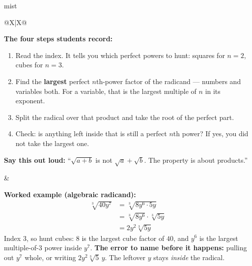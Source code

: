 \documentclass[10pt]{article}
\begin{document}
\boxguard
\begin{skillbox}{mist}
\begin{tabularx}{\linewidth}{@{}X|X@{}}
\begin{minipage}[t]{\linewidth}\vspace{0pt}
\textbf{The four steps students record:}
\begin{enumerate}[leftmargin=1.4em, itemsep=2pt, topsep=2pt]
  \item Read the index. It tells you which perfect powers to hunt: squares for $n=2$, cubes for
        $n=3$.
  \item Find the \textbf{largest} perfect $n$th-power factor of the radicand --- numbers and
        variables both. For a variable, that is the largest multiple of $n$ in its exponent.
  \item Split the radical over that product and take the root of the perfect part.
  \item Check: is anything left inside that is still a perfect $n$th power? If yes, you did not
        take the largest one.
\end{enumerate}
\textbf{Say this out loud:} ``$\sqrt{a+b}$ is not $\sqrt a + \sqrt b$. The property is about
products.''
\end{minipage}
&
\begin{minipage}[t]{\linewidth}\vspace{0pt}
\textbf{Worked example (algebraic radicand):}
\[
\begin{aligned}
\sqrt[3]{40y^7} &= \sqrt[3]{8y^6 \cdot 5y} \\
                &= \sqrt[3]{8y^6}\cdot\sqrt[3]{5y} \\
                &= 2y^2\sqrt[3]{5y}
\end{aligned}
\]
Index $3$, so hunt cubes: $8$ is the largest cube factor of $40$, and $y^6$ is the largest
multiple-of-$3$ power inside $y^7$. \textbf{The error to name before it happens:} pulling out
$y^7$ whole, or writing $2y^2\sqrt[3]{5}\,y$. The leftover $y$ stays \emph{inside} the radical.
\end{minipage}
\end{tabularx}
\end{skillbox}
\end{document}

